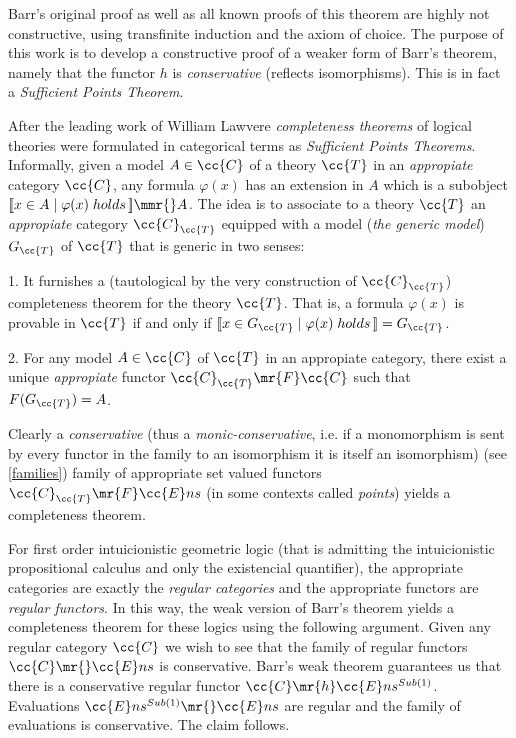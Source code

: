 Barr's original proof as well as all known proofs of this theorem are highly not constructive, using transfinite induction and the axiom of choice. The purpose of this work is to develop a constructive proof of a weaker form of Barr's theorem, namely that the functor $h$ is \emph{conservative} (reflects isomorphisms). This is in fact a \emph{Sufficient Points Theorem}. 

\vspace{1ex}

After the leading work of William Lawvere \textit{completeness theorems} of logical theories were formulated in categorical terms as \emph{Sufficient Points Theorems}. Informally, given a model $A \in \cc{C}$ of a theory $\cc{T}$ in an \emph{appropiate} category $\cc{C}$, any formula $\varphi(x)$ has an extension in $A$ which is a subobject \mbox{$[\![ x \in A \; | \; \varphi(x) \; holds\,]\!] \mmr{} A$.}  The idea is to associate to a theory $\cc{T}$  an \emph{appropiate} category $\cc{C}_{\cc{T}}$ equipped with a model (\emph{the generic model}) $G_{\cc{T}}$ of $\cc{T}$ that is generic in two senses:

\vspace{1ex}

1. It furnishes a (tautological by the very construction of $\cc{C}_{\cc{T}}$) completeness theorem for the theory $\cc{T}$. That is, a formula $\varphi(x)$ is provable in $\cc{T}$ if and only if 
$[\![ x \in G_{\cc{T}} \; | \; \varphi(x) \; holds\,]\!] = G_{\cc{T}}$.

\vspace{1ex}

2. For any model  $A \in \cc{C}$ of $\cc{T}$ in an appropiate category, there exist a unique \emph{appropiate} functor $\cc{C}_{\cc{T}} \mr{F} \cc{C}$ such that $F(G_{\cc{T}}) = A$.

\vspace{1ex}

\noindent Clearly a \emph{conservative} (thus a \emph{ monic-conservative}, i.e. if a monomorphism is sent by every functor in the family to an isomorphism it is itself an isomorphism) (see \ref{families}) family of appropriate set valued functors ${\cc{C}_{\cc{T}} \mr{F} \cc{E}ns}$ (in some contexts called \emph{points}) yields a completeness theorem.

 For first order intuicionistic geometric logic (that is admitting the intuicionistic propositional calculus and only the existencial quantifier), the appropriate categories are exactly the \emph{regular categories} and the appropriate functors are  \emph{regular functors}. In this way, the weak version of Barr's theorem yields a completeness theorem for these logics using the following argument. Given any regular category $\cc{C}$ we wish to see that the family of regular functors $\cc{C} \mr{} \cc{E}ns$ is conservative. Barr's weak theorem guarantees us that there is a conservative regular functor ${\cc{C} \mr{h} \cc{E}ns^{Sub(1)}}$. Evaluations ${\cc{E}ns^{Sub(1)} \mr{} \cc{E}ns}$ are regular  and the family of evaluations is conservative. The claim follows. 

